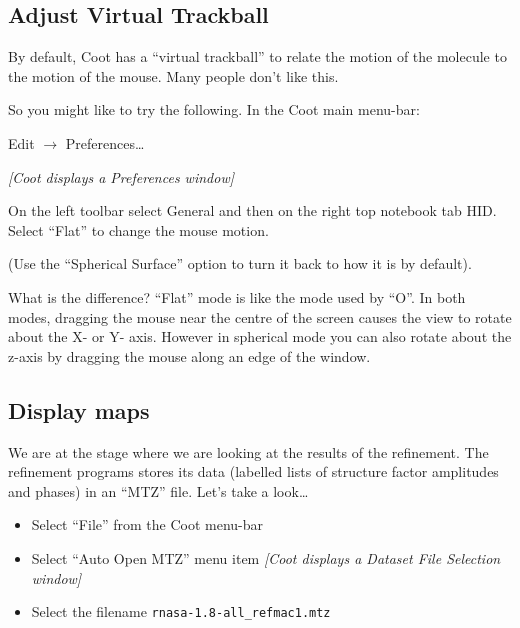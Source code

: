 \documentclass{article}
\begin{document}
\subsection{Adjust Virtual Trackball}
By default, Coot has a ``virtual trackball'' to relate the motion of
the molecule to the motion of the mouse.  Many people don't like this.

So you might like to try the following. In the Coot main menu-bar:

\textsf{Edit $\rightarrow$ Preferences\ldots}

\textsl{  [Coot displays a Preferences window]}

On the left toolbar select \textsf{General} and then on the right top 
notebook tab \textsf{HID}. Select \textsf{``Flat''} to change the mouse motion.

(Use the \textsf{``Spherical Surface''} option to turn it back to how
it is by default).


What is the difference? ``Flat'' mode is like the mode used by ``O''.
In both modes, dragging the mouse near the centre of the screen causes
the view to rotate about the X- or Y- axis. However in spherical mode
you can also rotate about the z-axis by dragging the mouse along an
edge of the window.

\subsection{Display maps}

We are at the stage where we are looking at the results of the
refinement.  The refinement programs stores its data (labelled lists
of structure factor amplitudes and phases) in an ``MTZ'' file.  Let's
take a look\ldots


\begin{itemize}
\item Select \textsf{``File''} from the Coot menu-bar
\item Select \textsf{``Auto Open MTZ''} menu item
\textsl{  [Coot displays a Dataset File Selection window]}
\item Select the filename \texttt{rnasa-1.8-all\_refmac1.mtz}
\end{itemize}
\end{document}
